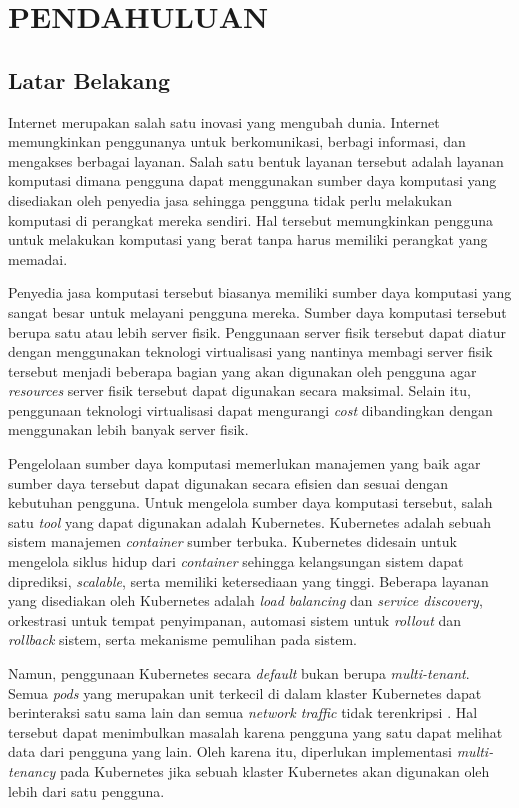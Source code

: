 \chapter{PENDAHULUAN}

\section{Latar Belakang}

Internet merupakan salah satu inovasi yang mengubah dunia. Internet
memungkinkan penggunanya untuk berkomunikasi, berbagi informasi, dan
mengakses berbagai layanan. Salah satu bentuk layanan tersebut adalah
layanan komputasi dimana pengguna dapat menggunakan sumber daya komputasi
yang disediakan oleh penyedia jasa sehingga pengguna tidak perlu melakukan
komputasi di perangkat mereka sendiri. Hal tersebut memungkinkan pengguna untuk
melakukan komputasi yang berat tanpa harus memiliki perangkat yang
memadai.

Penyedia jasa komputasi tersebut biasanya memiliki sumber daya komputasi
yang sangat besar untuk melayani pengguna mereka. Sumber daya komputasi
tersebut berupa satu atau lebih server fisik. Penggunaan server
fisik tersebut dapat diatur dengan menggunakan teknologi virtualisasi
yang nantinya membagi server fisik tersebut menjadi beberapa bagian
yang akan digunakan oleh pengguna agar \emph{resources} server fisik tersebut
dapat digunakan secara maksimal. Selain itu, penggunaan teknologi virtualisasi dapat
mengurangi \emph{cost} dibandingkan dengan menggunakan lebih banyak server fisik.

Pengelolaan sumber daya komputasi memerlukan manajemen yang baik agar sumber
daya tersebut dapat digunakan secara efisien dan sesuai dengan kebutuhan
pengguna. Untuk mengelola sumber daya komputasi tersebut, salah satu
\emph{tool} yang dapat digunakan adalah Kubernetes. Kubernetes
adalah sebuah sistem manajemen \emph{container} sumber terbuka. Kubernetes
didesain untuk mengelola siklus hidup dari \emph{container} sehingga kelangsungan
sistem dapat diprediksi, \emph{scalable}, serta memiliki ketersediaan yang tinggi.
Beberapa layanan yang disediakan oleh Kubernetes adalah \emph{load balancing} dan
\emph{service discovery}, orkestrasi untuk tempat penyimpanan, automasi sistem
untuk \emph{rollout} dan \emph{rollback} sistem, serta mekanisme pemulihan
pada sistem.

Namun, penggunaan Kubernetes secara \emph{default} bukan berupa \emph{multi-tenant}.
Semua \emph{pods} yang merupakan unit terkecil di dalam klaster Kubernetes dapat
berinteraksi satu sama lain dan semua \emph{network traffic} tidak terenkripsi \parencite{kubernetes-website-multi-tenancy}.
Hal tersebut dapat menimbulkan masalah karena pengguna yang satu dapat
melihat data dari pengguna yang lain. Oleh karena itu, diperlukan
implementasi \emph{multi-tenancy} pada Kubernetes jika sebuah klaster Kubernetes
akan digunakan oleh lebih dari satu pengguna.

